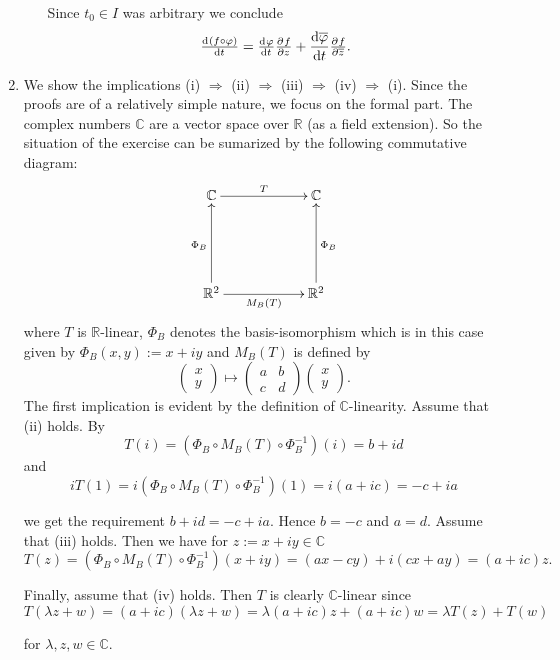 \begin{enumerate}[label = \textbf{Exercise \arabic*.},wide = 0pt, itemsep=1.5ex]
\begin{enumerate}[label = (\roman*),wide = 0pt, itemsep=1.5ex]
				Since $t_0 \in I$ was arbitrary we conclude
				\begin{equation}
					\od{(f \circ \varphi)}{t} = \od{\varphi}{t}\pd{f}{z} + \frac{\d \overline{\varphi}}{\d t}\pd{f}{\overline{z}}.
				\end{equation}
				\end{enumerate}

	\item We show the implications (i) $\Rightarrow$ (ii) $\Rightarrow$ (iii) $\Rightarrow$ (iv) $\Rightarrow$ (i). Since the proofs are of a relatively simple nature, we focus on the formal part. The complex numbers $\mathbb{C}$ are a vector space over $\mathbb{R}$ (as a field extension). So the situation of the exercise can be sumarized by the following commutative diagram:
		\[
			\xymatrix@=2cm{
				\mathbb{C} \ar[r]^T &\mathbb{C}\\
				\mathbb{R}^2 \ar[u]^{\Phi_B} \ar[r]_{M_B(T)} &\mathbb{R}^2 \ar[u]_{\Phi_B}}
	 	\]
		\noindent where $T$ is $\mathbb{R}$-linear, $\Phi_B$ denotes the basis-isomorphism which is in this case given by $\Phi_B(x,y) := x + iy$ and $M_B(T)$ is defined by
		\begin{equation}
			\begin{pmatrix}
				x\\
				y
			\end{pmatrix} \mapsto
			\begin{pmatrix}
				a & b\\
				c & d
			\end{pmatrix}
			\begin{pmatrix}
				x\\
				y
			\end{pmatrix}.
		\end{equation}
		The first implication is evident by the definition of $\mathbb{C}$-linearity. Assume that (ii) holds. By 
		\begin{equation}
			T(i) = (\Phi_B \circ M_B(T) \circ \Phi_B^{-1})(i) = b + id
		\end{equation}
		\noindent and
		\begin{equation}
			iT(1) = i(\Phi_B \circ M_B(T) \circ \Phi_B^{-1})(1) = i(a + ic) = -c + ia 
		\end{equation}

		\noindent we get the requirement $b + id = -c + ia$. Hence $b = -c$ and $a = d$. Assume that (iii) holds. Then we have for $z := x + iy \in \mathbb{C}$
		\begin{equation}
			T(z) = (\Phi_B \circ M_B(T) \circ \Phi_B^{-1})(x + iy) = (ax - cy) + i(cx + ay) = (a + ic)z.
		\end{equation}

		Finally, assume that (iv) holds. Then $T$ is clearly $\mathbb{C}$-linear since 
		\begin{equation}
			T(\lambda z + w) = (a + ic)(\lambda z + w) = \lambda(a + ic)z + (a + ic)w = \lambda T(z) + T(w)
		\end{equation}

		\noindent for $\lambda,z,w \in \mathbb{C}$.
\end{enumerate}
\printbibliography

